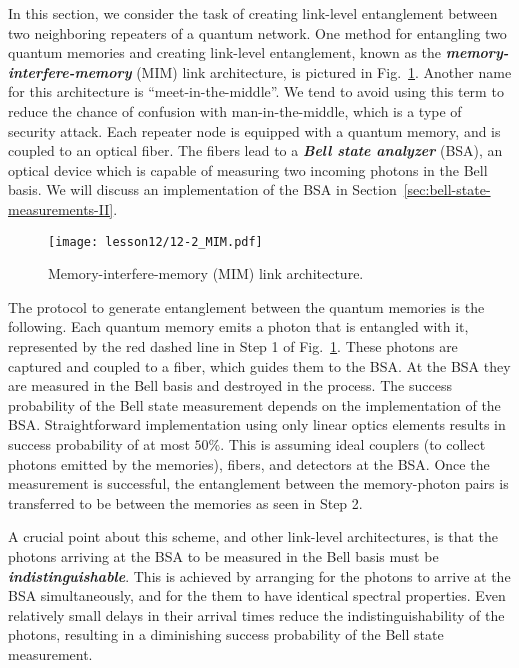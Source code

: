 In this section, we consider the task of creating link-level entanglement between two neighboring repeaters of a quantum network.
One method for entangling two quantum memories and creating link-level entanglement, known as the \emph{\textbf{memory-interfere-memory}} (MIM) link architecture, is pictured in Fig.~\ref{fig:12-2_MIM}.
Another name for this architecture is ``meet-in-the-middle''.
We tend to avoid using this term to reduce the chance of confusion with man-in-the-middle, which is a type of security attack.
Each repeater node is equipped with a quantum memory, and is coupled to an optical fiber.
The fibers lead to a \emph{\textbf{Bell state analyzer}} (BSA), an optical device which is capable of measuring two incoming photons in the Bell basis.
We will discuss an implementation of the BSA in Section~\ref{sec:bell-state-measurements-II}.

\begin{figure}[t]
    \centering
    \texttt{[image: lesson12/12-2\_MIM.pdf]}
    \caption[MIM link architecture.]{Memory-interfere-memory (MIM) link architecture.}
    \label{fig:12-2_MIM}
\end{figure}

The protocol to generate entanglement between the quantum memories is the following.
Each quantum memory emits a photon that is entangled with it, represented by the red dashed line in Step 1 of Fig.~\ref{fig:12-2_MIM}.
These photons are captured and coupled to a fiber, which guides them to the BSA.
At the BSA they are measured in the Bell basis and destroyed in the process.
The success probability of the Bell state measurement depends on the implementation of the BSA.
Straightforward implementation using only linear optics elements results in success probability of at most $50\%$.
This is assuming ideal couplers (to collect photons emitted by the memories), fibers, and detectors at the BSA.
Once the measurement is successful, the entanglement between the memory-photon pairs is transferred to be between the memories as seen in Step 2.

A crucial point about this scheme, and other link-level architectures, is that the photons arriving at the BSA to be measured in the Bell basis must be \textit{\textbf{indistinguishable}}.
This is achieved by arranging for the photons to arrive at the BSA simultaneously, and for the them to have identical spectral properties. 
Even relatively small delays in their arrival times reduce the indistinguishability of the photons, resulting in a diminishing success probability of the Bell state measurement.

